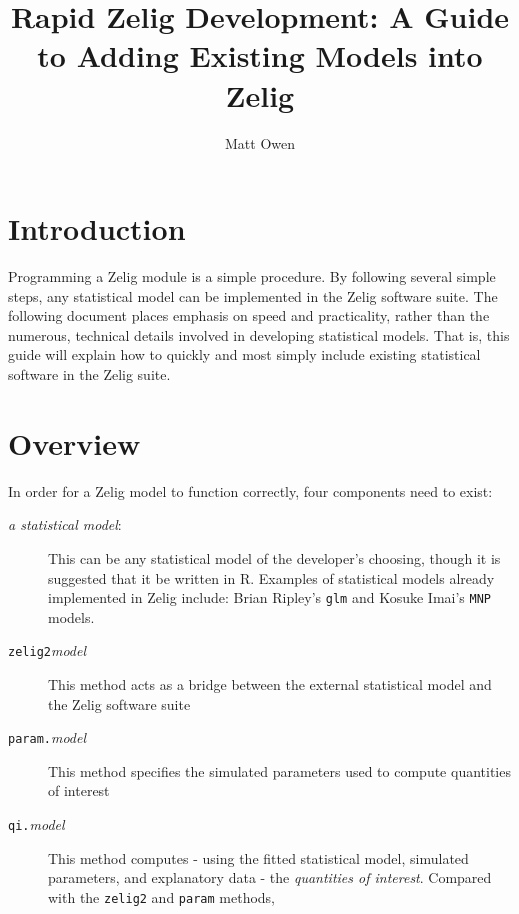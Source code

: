 \documentclass{article}
\title{Rapid Zelig Development: A Guide to Adding Existing Models into Zelig}
\author{Matt Owen}
\newcommand{\code}[1]{{\tt #1}}
\begin{document}
\maketitle



\section{Introduction}\label{section:introduction}

Programming a Zelig module is a simple procedure. By following several simple steps, any statistical model can be implemented in the Zelig software suite. The following document places emphasis on speed and practicality, rather than the numerous, technical details involved in developing statistical models. That is, this guide will explain how to quickly and most simply include existing statistical software in the Zelig suite.



\section{Overview}\label{section:overview}

In order for a Zelig model to function correctly, four components need to exist:

\begin{description}

	\item[\emph{a statistical model}:] This can be any statistical model of the developer's choosing, though it is suggested that it be written in R. Examples of statistical models already implemented in Zelig include: Brian Ripley's \code{glm} and Kosuke Imai's \code{MNP} models.

	\item[\code{zelig2}\emph{model}] This method acts as a bridge between the external statistical model and the Zelig software suite

	\item[\code{param.}\emph{model}] This method specifies the simulated parameters used to compute quantities of interest

	\item[\code{qi.}\emph{model}] This method computes - using the fitted statistical model, simulated parameters, and explanatory data - the \emph{quantities of interest}. Compared with the \code{zelig2} and \code{param} methods, 

\end{description}
\end{document}
